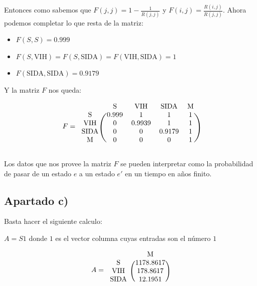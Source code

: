 \documentclass[11pt]{article}
\begin{document}
Entonces como sabemos que $F(j, j) = 1 - \frac{1}{R(j, j)}$ y $F(i, j) = \frac{R(i, j)}{R(j, j)}$.
Ahora podemos completar lo que resta de la matriz:

\begin{itemize}
  \item $ F(S, S) = 0.999$
  \item $ F(S, \text{VIH}) = F(S, \text{SIDA}) = F(\text{VIH}, \text{SIDA}) = 1 $
  \item $ F(\text{SIDA}, \text{SIDA}) = 0.9179$
\end{itemize}
  
Y la matriz $F$ nos queda:

\begin{equation*}
  F = 
  \begin{blockarray}{ccccc}
     & \text{S} & \text{VIH} & \text{SIDA} & \text{M} \\
    \begin{block}{c(cccc)}
      \text{S}    & 0.999 & 1      & 1      & 1 \\
      \text{VIH}  & 0     & 0.9939 & 1      & 1 \\
      \text{SIDA} & 0     & 0      & 0.9179 & 1 \\
      \text{M}    & 0     & 0      & 0      & 1 \\
    \end{block}
  \end{blockarray}
\end{equation*}

Los datos que nos provee la matriz $F$ se pueden interpretar como la probabilidad
de pasar de un estado $e$ a un estado $e'$ en un tiempo en años finito.


\subsection*{Apartado c)}

Basta hacer el siguiente calculo:

$ A = S1 $ donde $1$ es el vector columna cuyas entradas son el número $1$

\begin{equation*}
  A = 
  \begin{blockarray}{cc}
     & \text{M} \\
    \begin{block}{c(c)}
      \text{S}    & 1178.8617 \\
      \text{VIH}  & 178.8617 \\
      \text{SIDA} & 12.1951 \\
    \end{block}
  \end{blockarray}
\end{equation*}
\end{document}
